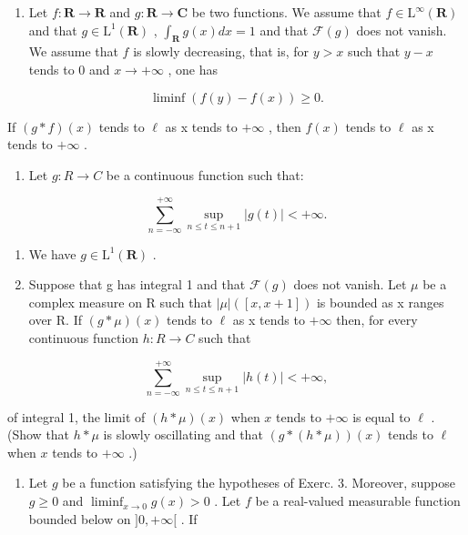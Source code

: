 \begin{enumerate}
\def\labelenumi{\arabic{enumi})}
\setcounter{enumi}{5}
\tightlist
\item
  Let \(f \colon \mathbf{R} \to \mathbf{R}\) and \(g: \mathbf{R} \to \mathbf{C}\) be two functions. We assume that \(f \in \mathrm{L}^{\infty}(\mathbf{R})\) and that \(g \in \mathrm{L}^{1}(\mathbf{R})\) , \(\int_{\mathbf{R}} g(x) dx = 1\) and that \(\mathcal{F}(g)\) does not vanish. We assume that \(f\) is slowly decreasing, that is, for \(y > x\) such that \(y - x\) tends to 0 and \(x \to +\infty\) , one has
\end{enumerate}

\[
\liminf (f (y) - f (x)) \geqslant 0.
\]

If \((g*f)(x)\) tends to \(\ell\) as x tends to \(+\infty\) , then \(f(x)\) tends to \(\ell\) as x tends to \(+\infty\) .

\begin{enumerate}
\def\labelenumi{\arabic{enumi})}
\setcounter{enumi}{6}
\tightlist
\item
  Let \(g: R \rightarrow C\) be a continuous function such that:
\end{enumerate}

\[
\sum_ {n = - \infty} ^ {+ \infty} \sup _ {n \leqslant t \leqslant n + 1} | g (t) | <   + \infty .
\]

\begin{enumerate}
\def\labelenumi{\alph{enumi})}
\item
  We have \(g \in \mathrm{L}^{1}(\mathbf{R})\) .
\item
  Suppose that g has integral 1 and that \(\mathcal{F}(g)\) does not vanish. Let \(\mu\) be a complex measure on R such that \(|\mu|([x,x+1])\) is bounded as x ranges over R. If \((g*\mu)(x)\) tends to \(\ell\) as x tends to \(+\infty\) then, for every continuous function \(h:R\to C\) such that
\end{enumerate}

\[
\sum_ {n = - \infty} ^ {+ \infty} \sup _ {n \leqslant t \leqslant n + 1} | h (t) | <   + \infty ,
\]

of integral 1, the limit of \((h * \mu)(x)\) when \(x\) tends to \(+\infty\) is equal to \(\ell\) . (Show that \(h * \mu\) is slowly oscillating and that \((g * (h * \mu))(x)\) tends to \(\ell\) when \(x\) tends to \(+\infty\) .)

\begin{enumerate}
\def\labelenumi{\arabic{enumi})}
\setcounter{enumi}{7}
\tightlist
\item
  Let \(g\) be a function satisfying the hypotheses of Exerc. 3. Moreover, suppose \(g \geqslant 0\) and \(\liminf_{x \to 0} g(x) > 0\) . Let \(f\) be a real-valued measurable function bounded below on \(]0, +\infty[\) . If
\end{enumerate}

